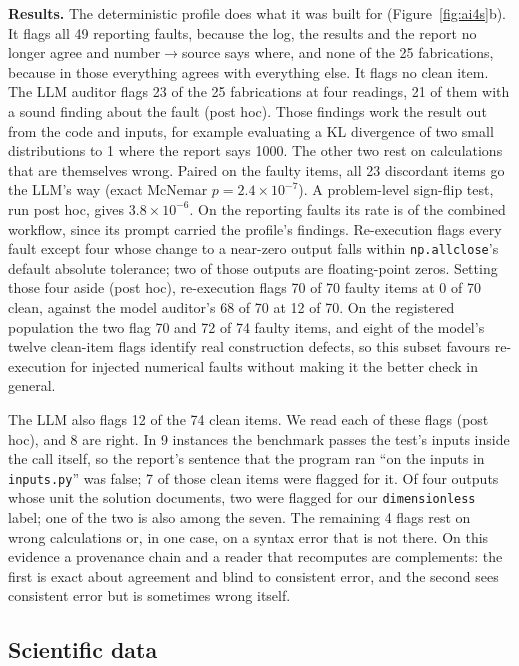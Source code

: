 \textbf{Results.} The deterministic profile does what it was built for (Figure~\ref{fig:ai4s}b).
It flags all 49 reporting faults, because the log, the results and the report no longer agree and
number$\to$source says where, and none of the 25 fabrications, because in those everything agrees
with everything else. It flags no clean item. The LLM auditor flags 23 of the 25 fabrications at
four readings, 21 of them with a sound finding about the fault (post hoc). Those findings work the
result out from the code and inputs, for example evaluating a KL divergence of two small
distributions to 1 where the report says 1000. The other two rest on calculations that are
themselves wrong. Paired on the faulty items, all 23 discordant items go the LLM's way (exact
McNemar $p = 2.4\times10^{-7}$). A problem-level sign-flip test, run post hoc, gives $3.8\times10^{-6}$.
On the reporting faults its rate is of the combined workflow, since its prompt carried the
profile's findings. Re-execution flags every fault except four whose change to a near-zero output falls within
\texttt{np.allclose}'s default absolute tolerance; two of those outputs are floating-point zeros. Setting those four aside (post hoc), re-execution flags 70 of 70 faulty items at 0 of 70 clean, against the model auditor's 68 of 70 at 12 of 70. On the registered population the two flag 70 and 72 of 74 faulty items, and eight of the model's twelve clean-item flags identify real construction defects, so this subset favours re-execution for injected numerical faults without making it the better check in general.

The LLM also flags 12 of the 74 clean items. We read each of these flags (post hoc), and 8 are right. In 9 instances the
benchmark passes the test's inputs inside the call itself, so the report's sentence that the
program ran ``on the inputs in \texttt{inputs.py}'' was false; 7 of those clean items were flagged
for it. Of four outputs whose unit the solution documents, two were flagged for our
\texttt{dimensionless} label; one of the two is also among the seven. The remaining 4 flags rest on wrong calculations or, in one case, on
a syntax error that is not there. On this evidence a provenance chain and a reader that recomputes
are complements: the first is exact about agreement and blind to consistent error, and the second
sees consistent error but is sometimes wrong itself.



\subsection{Scientific data}
\label{sec:ai4s-data-full}

